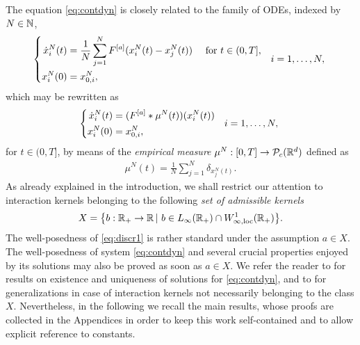 The equation \eqref{eq:contdyn} is closely related to the family of ODEs, indexed by $N \in \mathbb{N}$,
\begin{align}\label{eq:discrdyn}
\left\{\begin{aligned}
\dot{x}^N_i(t) &= \frac{1}{N}\sum^N_{j = 1}F^{[a]}(x^N_i(t) - x^N_j(t)) \quad \text{ for } t \in (0,T],\\
x_i^N(0) &= x^N_{0,i},
\end{aligned} \quad i = 1, \ldots, N, \right.
\end{align}
which may be rewritten as 
\begin{align}\label{eq:discr1}
\left\{\begin{aligned}
\dot{x}^N_i(t) &= (F^{[a]}*\mu^N(t))(x^N_i(t)) \\
x^N_i(0) &= x^N_{0,i},
\end{aligned} \quad i = 1, \ldots, N, \right.
\end{align}
for $t\in(0,T]$, by means of the \textit{empirical measure} $\mu^N:[0,T]\rightarrow\mathcal{P}_c(\mathbb{R}^d)$ defined as
\begin{align}\label{eq:empmeas}
\mu^N(t) = \frac{1}{N}\sum^N_{j = 1} \delta_ {x^N_j(t)}.
\end{align}
As already explained in the introduction, we shall restrict our attention to interaction kernels belonging to the following \textit{set of admissible kernels}
\begin{align*}
	X=\bigl\{b:\mathbb{R}_+\rightarrow\mathbb{R}\,|\ b \in L_{\infty}(\mathbb{R}_+) \cap W^{1}_{\infty,\textup{loc}}(\mathbb{R}_+) \bigr \}.
\end{align*}
The well-posedness of \eqref{eq:discr1} is rather standard under the assumption $a \in X$. The well-posedness of system \eqref{eq:contdyn} and several crucial properties enjoyed by its solutions may also be proved as soon as $a \in X$.
We refer the reader to \cite{AGS} for results on existence and uniqueness of solutions for \eqref{eq:contdyn}, and to  \cite{13-Carrillo-Choi-Hauray-MFL} for generalizations in case of interaction kernels not necessarily belonging to the class $X$. Nevertheless, in the following we recall the main results, whose proofs are collected in the Appendices in order to keep this work self-contained and to allow explicit reference to constants.
 


